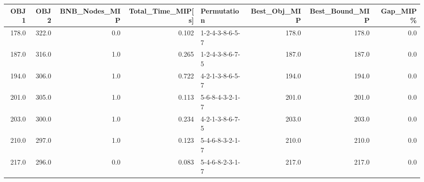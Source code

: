 \begin{tabular}{rrrrlrrr}
\toprule
  OBJ1 &   OBJ2 &  BNB\_Nodes\_MIP &  Total\_Time\_MIP[s] &      Permutation &  Best\_Obj\_MIP &  Best\_Bound\_MIP &  Gap\_MIP\% \\
\midrule
 178.0 &  322.0 &            0.0 &              0.102 &  1-2-4-3-8-6-5-7 &         178.0 &           178.0 &       0.0 \\
 187.0 &  316.0 &            1.0 &              0.265 &  1-2-4-3-8-6-7-5 &         187.0 &           187.0 &       0.0 \\
 194.0 &  306.0 &            1.0 &              0.722 &  4-2-1-3-8-6-5-7 &         194.0 &           194.0 &       0.0 \\
 201.0 &  305.0 &            1.0 &              0.113 &  5-6-8-4-3-2-1-7 &         201.0 &           201.0 &       0.0 \\
 203.0 &  300.0 &            1.0 &              0.234 &  4-2-1-3-8-6-7-5 &         203.0 &           203.0 &       0.0 \\
 210.0 &  297.0 &            1.0 &              0.123 &  5-4-6-8-3-2-1-7 &         210.0 &           210.0 &       0.0 \\
 217.0 &  296.0 &            0.0 &              0.083 &  5-4-6-8-2-3-1-7 &         217.0 &           217.0 &       0.0 \\
\bottomrule
\end{tabular}
